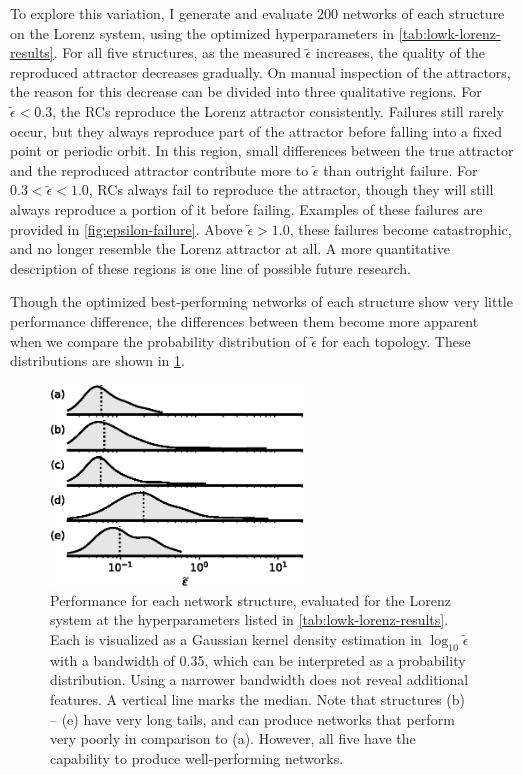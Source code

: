 To explore this variation, I generate and evaluate $200$ networks of
each structure on the Lorenz system, using the optimized
hyperparameters in \cref{tab:lowk-lorenz-results}. For all five
structures, as the measured $\tilde{\epsilon}$ increases, the quality
of the reproduced attractor decreases gradually. On manual inspection
of the attractors, the reason for this decrease can be divided into
three qualitative regions. For $\tilde{\epsilon} < 0.3$, the RCs
reproduce the Lorenz attractor consistently. Failures still rarely
occur, but they always reproduce part of the attractor before falling
into a fixed point or periodic orbit. In this region, small
differences between the true attractor and the reproduced attractor
contribute more to $\tilde{\epsilon}$ than outright failure. For $0.3
< \tilde{\epsilon} < 1.0$, RCs always fail to reproduce the attractor,
though they will still always reproduce a portion of it before
failing. Examples of these failures are provided in
\cref{fig:epsilon-failure}. Above $\tilde{\epsilon} > 1.0$, these
failures become catastrophic, and no longer resemble the Lorenz
attractor at all. A more quantitative description of these regions is
one line of possible future research.

Though the optimized best-performing networks of
each structure show very little performance difference, the differences
between them become more apparent when we compare the probability
distribution of $\tilde{\epsilon}$ for each topology. These
distributions are shown in \cref{fig:epsilon-distribution}.

\begin{figure}
  \includegraphics[width=0.6\textwidth]{figures/epsilon-distribution}
  \caption{Performance for each network structure, evaluated for the
    Lorenz system at the hyperparameters listed in
    \cref{tab:lowk-lorenz-results}. Each is visualized as a Gaussian
    kernel density estimation in $\log_{10} \tilde{\epsilon}$ with a bandwidth
    of 0.35,\cite{scott1992} which can be interpreted as a probability
    distribution. Using a narrower bandwidth does not reveal
    additional features. A vertical line marks the median.  Note that
    structures (b) -- (e) have very long tails, and can produce
    networks that perform very poorly in comparison to (a). However,
    all five have the capability to produce well-performing
    networks.}%
  \label{fig:epsilon-distribution}
\end{figure}

